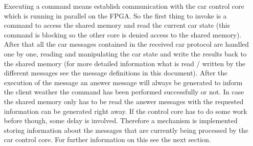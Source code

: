 Executing a command means establish communication with the car control core which is running in parallel on the FPGA. So the first thing to invoke is a command 
to access the shared memory and read the current car state (this command is blocking so the other core is denied access to the shared memory). After that
all the car messages contained in the received car protocol are handled one by one, reading and manipulating the car state and write the results back to the shared memory (for more detailed information what is read / written by the different messages see the message definitions in this document). After the execution of the message an answer message will always be generated to inform the client weather the command has been performed successfully or not. In case the shared memory only has to be read the answer messages with the requested information can be generated right away. If the control core has to do some work before though, some delay is involved. Therefore a mechanism is implemented storing information about the messages that are currently being processed by the car control core. For further information on this see the next section.

